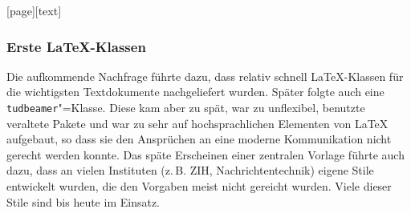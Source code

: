 [page][text]
\begin{frame}[allowframebreaks]\frametitle{Erste \LaTeX{}-Klassen}
  Die aufkommende Nachfrage führte dazu, dass relativ schnell
  \LaTeX-Klassen für die wichtigsten Textdokumente nachgeliefert
  wurden. Später folgte auch eine \texttt{tudbeamer}"=Klasse. Diese
  kam aber zu spät, war zu unflexibel, benutzte veraltete Pakete und
  war zu sehr auf hochsprachlichen Elementen von \LaTeX{} aufgebaut,
  so dass sie den Ansprüchen an eine moderne Kommunikation nicht
  gerecht werden konnte. Das späte Erscheinen einer zentralen Vorlage
  führte auch dazu, dass an vielen Instituten (z.\,B. ZIH,
  Nachrichtentechnik) eigene Stile entwickelt wurden, die den Vorgaben
  meist nicht gereicht wurden. Viele dieser Stile sind bis heute im
  Einsatz.
\end{frame}

